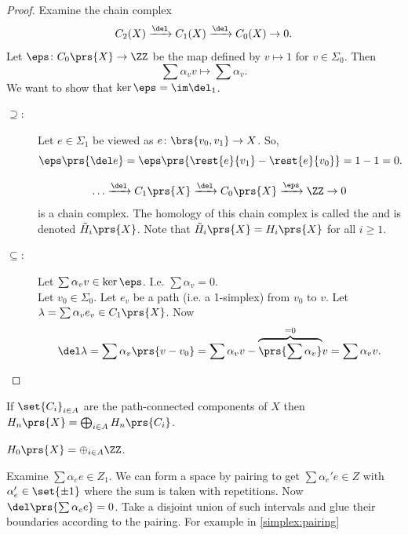 \documentclass[10pt,a4paper,twoside,openany,hidelinks]{book}
\begin{document}
\begin{proof}
Examine the chain complex
\[C_2(X) \xrightarrow{\del} C_1(X) \xrightarrow{\del} C_0(X) \rightarrow 0\text{.}\]
Let $\eps \colon C_0\prs{X} \to \ZZ$ be the map defined by $v \mapsto 1$ for $v \in \Sigma_0$. Then
\[\sum \alpha_v v \mapsto \sum \alpha_v \text{.}\]
We want to show that $\ker \eps = \im \del_1$.
\begin{description}
\item[$\supseteq$:]
Let $e \in \Sigma_1$ be viewed as $e \colon \brs{v_0, v_1} \to X$. So,
\[\eps \prs{\del e} = \eps \prs{\rest{e}{v_1} - \rest{e}{v_0}} = 1-1 = 0 \text{.}\]
\begin{remark}
\[\ldots \xrightarrow{\del} C_1\prs{X} \xrightarrow{\del} C_0\prs{X} \xrightarrow{\eps} \ZZ \to 0\]
is a chain complex. The homology of this chain complex is called the  and is denoted $\tilde{H}_i\prs{X}$. Note that $\tilde{H}_i\prs{X} = H_i\prs{X}$ for all $i \geq 1$.
\end{remark}
\item[$\subseteq$:]
Let $\sum \alpha_v v \in \ker \eps$. I.e. $\sum \alpha_v = 0$.\\
Let $v_0 \in \Sigma_0$. Let $e_v$ be a path (i.e. a 1-simplex) from $v_0$ to $v$. Let $\lambda = \sum \alpha_v e_v \in C_1\prs{X}$.
Now
\[\del \lambda = \sum \alpha_v\prs{v-v_0} = \sum \alpha_v v - \overset{=0}{\overbrace{\prs{\sum \alpha_v}}} v = \sum \alpha_v v \text{.}\]
\end{description}
\end{proof}
\begin{proposition}
If $\set{C_i}_{i \in A}$ are the path-connected components of $X$ then $H_n\prs{X} = \bigoplus_{i \in A} H_n\prs{C_i}$.
\end{proposition}
\begin{corollary}
$H_0\prs{X} = \oplus_{i \in A} \ZZ$.
\end{corollary}
Examine $\sum \alpha_e e \in Z_1$. We can form a space by pairing to get $\sum \alpha_e' e \in Z$ with $\alpha_e' \in \set{\pm 1}$ where the sum is taken with repetitions.
Now
$\del \prs{\sum \alpha_e e} = 0$. Take a disjoint union of such intervals and glue their boundaries according to the pairing.
For example in \eqref{simplex:pairing}
\end{document}
